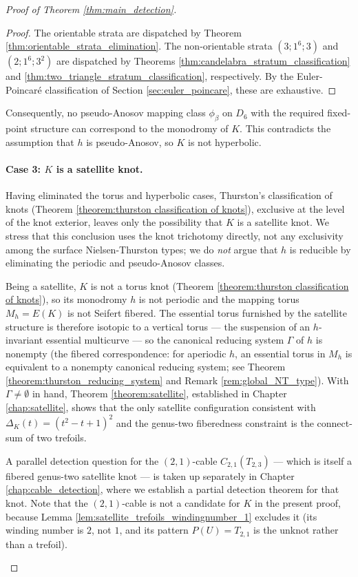\begin{proof}[Proof of Theorem \ref{thm:main_detection}]
\begin{proof}
The orientable strata are dispatched by Theorem \ref{thm:orientable_strata_elimination}. The non-orientable strata $(3; 1^6; 3)$ and $(2; 1^6; 3^2)$ are dispatched by Theorems \ref{thm:candelabra_stratum_classification} and \ref{thm:two_triangle_stratum_classification}, respectively. By the Euler-Poincar\'{e} classification of Section \ref{sec:euler_poincare}, these are exhaustive.
\end{proof}

Consequently, no pseudo-Anosov mapping class $\phi_\beta$ on $D_6$ with the required fixed-point structure can correspond to the monodromy of $K$. This contradicts the assumption that $h$ is pseudo-Anosov, so $K$ is not hyperbolic.

\paragraph{Case 3: $K$ is a satellite knot.}
Having eliminated the torus and hyperbolic cases, Thurston's classification of knots (Theorem \ref{theorem:thurston classification of knots}), exclusive at the level of the knot exterior, leaves only the possibility that $K$ is a satellite knot. We stress that this conclusion uses the knot trichotomy directly, not any exclusivity among the surface Nielsen-Thurston types; we do \emph{not} argue that $h$ is reducible by eliminating the periodic and pseudo-Anosov classes.

Being a satellite, $K$ is not a torus knot (Theorem \ref{theorem:thurston classification of knots}), so its monodromy $h$ is not periodic and the mapping torus $M_h = E(K)$ is not Seifert fibered. The essential torus furnished by the satellite structure is therefore isotopic to a vertical torus --- the suspension of an $h$-invariant essential multicurve --- so the canonical reducing system $\Gamma$ of $h$ is nonempty (the fibered correspondence: for aperiodic $h$, an essential torus in $M_h$ is equivalent to a nonempty canonical reducing system; see Theorem \ref{theorem:thurston_reducing_system} and Remark \ref{rem:global_NT_type}). With $\Gamma \neq \emptyset$ in hand, Theorem \ref{theorem:satellite}, established in Chapter \ref{chap:satellite}, shows that the only satellite configuration consistent with $\Delta_K(t) = (t^2-t+1)^2$ and the genus-two fiberedness constraint is the connect-sum of two trefoils.

\begin{remark}
A parallel detection question for the $(2,1)$-cable $C_{2,1}(T_{2,3})$ --- which is itself a fibered genus-two satellite knot --- is taken up separately in Chapter \ref{chap:cable_detection}, where we establish a partial detection theorem for that knot. Note that the $(2,1)$-cable is not a candidate for $K$ in the present proof, because Lemma \ref{lem:satellite_trefoils_windingnumber_1} excludes it (its winding number is $2$, not $1$, and its pattern $P(U) = T_{2,1}$ is the unknot rather than a trefoil).
\end{remark}


\end{proof}

